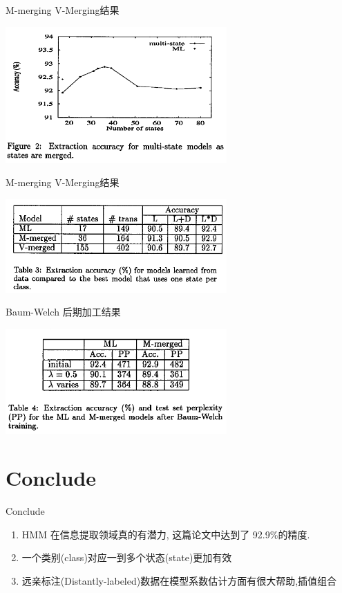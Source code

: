 \documentclass{beamer}
\begin{document}
\begin{frame}{M-merging V-Merging结果}
    \begin{center}
        \includegraphics[width=240pt]{report5/m-picture.png}
    \end{center}
\end{frame}

\begin{frame}{M-merging V-Merging结果}
    \begin{center}
        \includegraphics[width=240pt]{report5/m-picture2.png}
    \end{center}
\end{frame}

\begin{frame}{Baum-Welch 后期加工结果}
    \begin{center}
        \includegraphics[width=240pt]{report5/bw.png}
    \end{center}
\end{frame}

\section{Conclude}
\begin{frame}{Conclude}
\begin{enumerate}
            \pause
    \item HMM 在信息提取领域真的有潜力, 这篇论文中达到了 92.9\%的精度.
            \pause
    \item 一个类别(class)对应一到多个状态(state)更加有效
            \pause
    \item 远亲标注(Distantly-labeled)数据在模型系数估计方面有很大帮助,插值组合
\end{enumerate}
\end{frame}
\end{document}
